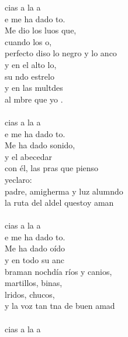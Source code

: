 \begin{cancion}%
	cias a la a \\
	e me ha dado to.\\
	Me dio los luos que, \\
	cuando los o,\\
	perfecto diso lo negro y lo anco\\
	y en el alto lo, \\
	su ndo estrelo\\
	y en las multdes\\
	al mbre que yo .\\
\jump\\
	cias a la a \\
	e me ha dado to.\\
	Me ha dado sonido, \\
	y el abecedar\\
	con él, las pras que pienso \\
	yeclaro:\\
	padre, amigherma y luz alumndo\\
	la ruta del aldel questoy aman\\
\jump\\
	cias a la a \\
	e me ha dado to.\\
	Me ha dado oído\\
	y en todo su anc\\
	braman nochdía ríos y canios,\\
	martillos, binas, \\
	lridos, chucos,\\
	y la voz tan tna de  buen amad\\
\jump\\
	cias a la a \\

\end{cancion}
